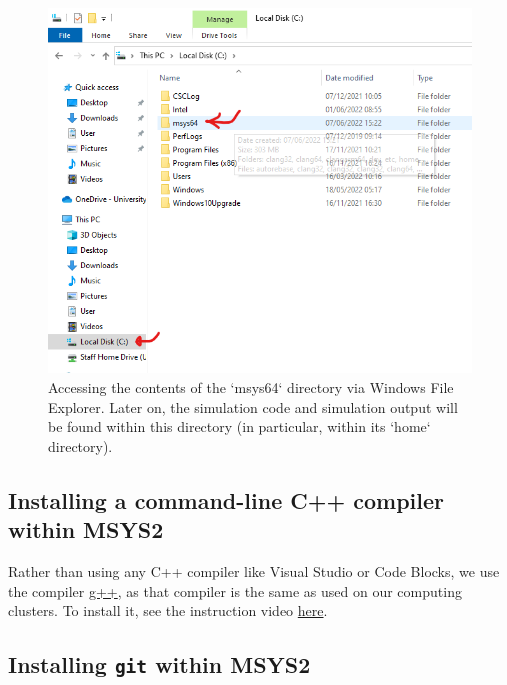 \documentclass[
]{book}
\begin{document}
\begin{figure}
\includegraphics[width=500pt]{images/screenshot_windows_msys} \caption{Accessing the contents of the `msys64` directory via Windows File Explorer. Later on, the simulation code and simulation output will be found within this directory (in particular, within its `home` directory).}\label{fig:figWindowsExplorer}
\end{figure}

\hypertarget{installing-a-command-line-c-compiler-within-msys2}{%
\subsection{Installing a command-line C++ compiler within MSYS2}\label{installing-a-command-line-c-compiler-within-msys2}}

Rather than using any C++ compiler like Visual Studio or Code Blocks, we use the compiler \href{https://gcc.gnu.org/}{g++}, as that compiler is the same as used on our computing clusters. To install it, see the instruction video \href{https://recapexeter.cloud.panopto.eu/Panopto/Pages/Viewer.aspx?id=f2acdf3c-224e-49be-8ae3-ad2400f2b3c1\&start=0}{here}.

\hypertarget{installing-git-within-msys2}{%
\subsection{\texorpdfstring{Installing \texttt{git} within MSYS2}{Installing git within MSYS2}}\label{installing-git-within-msys2}}
\end{document}
